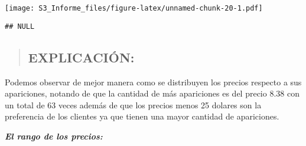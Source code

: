 \documentclass[
]{article}
\newenvironment{Shaded}{\begin{snugshade}}{\end{snugshade}}
\newcommand{\AttributeTok}[1]{\textcolor[rgb]{0.77,0.63,0.00}{#1}}
\newcommand{\CommentTok}[1]{\textcolor[rgb]{0.56,0.35,0.01}{\textit{#1}}}
\newcommand{\FunctionTok}[1]{\textcolor[rgb]{0.00,0.00,0.00}{#1}}
\newcommand{\NormalTok}[1]{#1}
\newcommand{\OtherTok}[1]{\textcolor[rgb]{0.56,0.35,0.01}{#1}}
\newcommand{\SpecialCharTok}[1]{\textcolor[rgb]{0.00,0.00,0.00}{#1}}
\newcommand{\StringTok}[1]{\textcolor[rgb]{0.31,0.60,0.02}{#1}}
\begin{document}
\begin{Shaded}
\end{Shaded}

\texttt{[image: S3\_Informe\_files/figure-latex/unnamed-chunk-20-1.pdf]}

\begin{verbatim}
## NULL
\end{verbatim}

\begin{quote}
\hypertarget{explicaciuxf3n-3}{%
\subsection{\texorpdfstring{\textbf{EXPLICACIÓN:}}{EXPLICACIÓN:}}\label{explicaciuxf3n-3}}
\end{quote}

Podemos observar de mejor manera como se distribuyen los precios
respecto a sus apariciones, notando de que la cantidad de más
apariciones es del precio 8.38 con un total de 63 veces además de que
los precios menos 25 dolares son la preferencia de los clientes ya que
tienen una mayor cantidad de apariciones.

\textbf{\emph{El rango de los precios:}}
\end{document}

